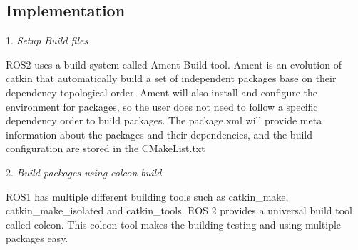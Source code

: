 \documentclass[letterpaper, 10 pt, conference]{ieeeconf}  %
\begin{document}
\subsection{Implementation}

1. \textit{Setup Build files} \par \vspace{5pt}
 ROS2 uses a build system called Ament Build tool. Ament is an evolution of catkin that automatically build a set of independent packages base on their dependency topological order. Ament will also install and configure the environment for packages, so the user does not need to follow a specific dependency order to build packages. The package.xml will provide meta information about the packages and their dependencies, and the build configuration are stored in the CMakeList.txt  \par \vspace{5pt}
 
2. \textit{Build packages using colcon build}\par\vspace{5pt}
ROS1 has multiple different building tools such as catkin\_make, catkin\_make\_isolated and catkin\_tools. ROS 2 provides a universal build tool called colcon. This colcon tool makes the building testing and using multiple packages easy\cite{c7}. \par\vspace{5pt}
\end{document}

